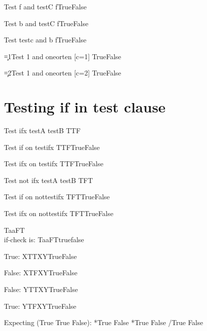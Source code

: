 \documentclass{article}
\begin{document}
Test f and testC \if f\testC True\else False\fi

Test b and testC \if f\testC True\else False\fi

Test testc and b  \if f\testC True\else False\fi

\c=1\relax Test 1 and oneorten [c=1]  \oneorten True\else False\fi

\c=2\relax Test 1 and oneorten [c=2]  \oneorten True\else False\fi

\section{Testing if in test clause}
\def\testifx{T\ifx\testA\testB T\else F\fi}

Test ifx testA testB \testifx

Test if on testifx \if\testifx True\else False\fi

Test ifx on testifx \if\testifx True\else False\fi

\def\nottestifx{T\ifx\testA\testB F\else T\fi}

Test not ifx testA testB \nottestifx

Test if on nottestifx \if\nottestifx True\else False\fi

Test ifx on nottestifx \ifx\nottestifx True\else False\fi


\def\a{a}%
 \let\b=\a
 \def\check{T\ifx\a\b F\else T\fi}

 \check\\

 if-check is: \if\check true\else false\fi


\def\innerif{\if\clause X\else Y\fi}

True: \def\clause{TT}\if X\innerif True\else False\fi

False: \def\clause{TF}\if X\innerif True\else False\fi

False: \def\clause{TT}\if Y\innerif True\else False\fi

True: \def\clause{TF}\if Y\innerif True\else False\fi

\def\a{*}
\let\b=*
\def\c{/}

Expecting (True True False):
\if*\a True \else False \fi
\if\a\b True \else False \fi
\if\a\c True \else False \fi
\end{document}

